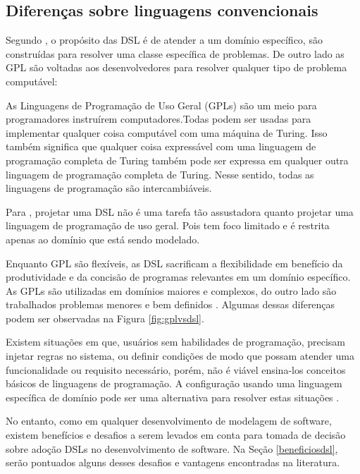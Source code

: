\subsection{Diferenças sobre linguagens convencionais}
\label{diferencasdsl}

Segundo , o propósito das \gls{DSL} é de atender a um domínio específico, são construídas para resolver uma classe específica de problemas. De outro lado as \gls{GPL} são voltadas aos desenvolvedores para resolver qualquer tipo de problema computável:

\begin{citacao}
As Linguagens de Programação de Uso Geral (GPLs) são um meio para programadores instruírem computadores.Todas podem ser usadas para implementar qualquer coisa computável com uma máquina de Turing. Isso também significa que qualquer coisa expressável com uma linguagem de programação completa de Turing também pode ser expressa em qualquer outra linguagem de programação completa de Turing. Nesse sentido, todas as linguagens de programação são intercambiáveis. \cite{dslengineering}
\end{citacao}

Para , projetar uma DSL não é uma tarefa tão assustadora quanto projetar uma linguagem de programação de uso geral. Pois tem foco limitado e é restrita apenas ao domínio que está sendo modelado.

Enquanto \gls{GPL} são flexíveis, as \gls{DSL} sacrificam a flexibilidade em benefício da produtividade e da concisão de programas relevantes em um domínio específico. As \gls{GPL}s são utilizadas em domínios maiores e complexos, do outro lado são trabalhados problemas menores e bem definidos \cite{dslengineering}. Algumas dessas diferenças podem ser observadas na  Figura \ref{fig:gplvsdsl}.



Existem situações em que, usuários sem habilidades de programação, precisam injetar regras no sistema, ou definir condições de modo que possam atender uma funcionalidade ou requisito necessário, porém, não é viável ensina-los conceitos básicos de linguagens de programação. A configuração usando uma linguagem específica de domínio pode ser uma alternativa para resolver estas situações \cite{novak2010easy}.  

No entanto, como em qualquer desenvolvimento de modelagem de software, existem benefícios e desafios a serem levados em conta para tomada de decisão sobre adoção \gls{DSL}s no desenvolvimento de software. Na Seção \ref{beneficiosdsl}, serão pontuados alguns desses desafios e vantagens encontradas na literatura.

